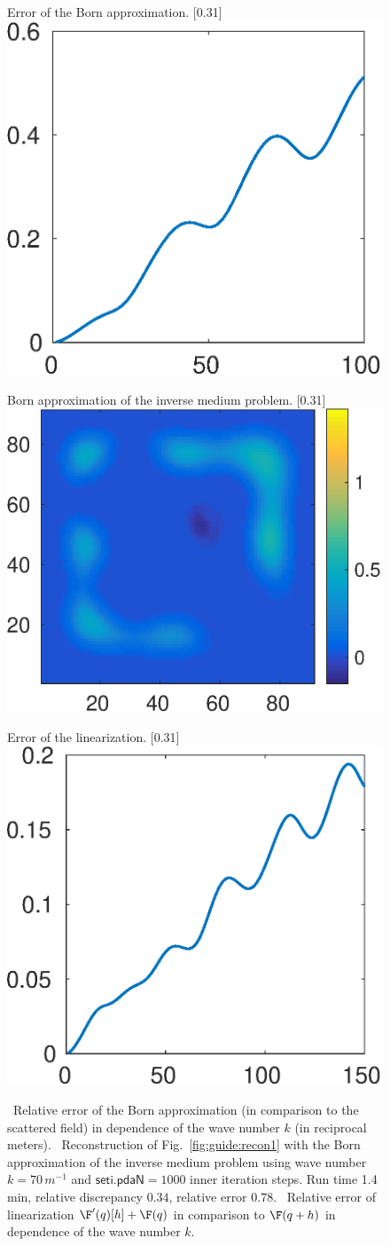 \documentclass[a4paper]{article}
\begin{document}
\begin{figure}
\centering
\begin{subcaptionbox}{Error of the Born approximation.
  \label{fig:born}}[0.31\textwidth]{
  \includegraphics[height=0.22\textwidth]{figs/fig_guideBornk}
  }
\end{subcaptionbox}
\begin{subcaptionbox}{Born approximation of the inverse medium problem.
  \label{fig:bornInv}}[0.31\textwidth]{
  \includegraphics[height=0.22\textwidth]{figs/fig_guideBornInv_1000}
  }
\end{subcaptionbox}
\begin{subcaptionbox}{Error of the linearization.
  \label{fig:lin}}[0.31\textwidth]{
  \includegraphics[height=0.22\textwidth]{figs/fig_guideLin}
  }
\end{subcaptionbox}
\caption{~Relative error of the Born approximation (in comparison to the scattered field) in dependence of the wave number $k$ (in reciprocal meters). 
~Reconstruction of Fig.~\ref{fig:guide:recon1} with the Born approximation of the inverse medium problem using wave number $k = 70\,\si{m^{-1}}$ and $\textsf{seti.pdaN} = 1000$ inner iteration steps. Run time 1.4\,min, relative discrepancy $0.34$, relative error $0.78$. 
~Relative error of linearization $\F'(q)[h]+\F(q)$ in comparison to $\F(q+h)$ in dependence of the wave number $k$.}
\label{fig:bornAndLin}
\end{figure}
\end{document}
